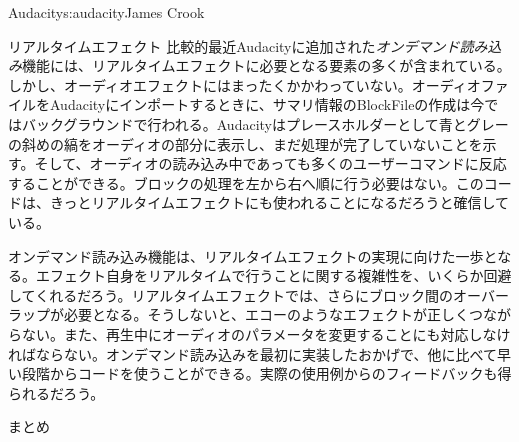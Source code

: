 \begin{aosachapter}{Audacity}{s:audacity}{James Crook}
\begin{aosasect1}{リアルタイムエフェクト}
比較的最近Audacityに追加された\emph{オンデマンド読み込み}機能には、リアルタイムエフェクトに必要となる要素の多くが含まれている。しかし、オーディオエフェクトにはまったくかかわっていない。オーディオファイルをAudacityにインポートするときに、サマリ情報のBlockFileの作成は今ではバックグラウンドで行われる。Audacityはプレースホルダーとして青とグレーの斜めの縞をオーディオの部分に表示し、まだ処理が完了していないことを示す。そして、オーディオの読み込み中であっても多くのユーザーコマンドに反応することができる。ブロックの処理を左から右へ順に行う必要はない。このコードは、きっとリアルタイムエフェクトにも使われることになるだろうと確信している。

オンデマンド読み込み機能は、リアルタイムエフェクトの実現に向けた一歩となる。エフェクト自身をリアルタイムで行うことに関する複雑性を、いくらか回避してくれるだろう。リアルタイムエフェクトでは、さらにブロック間のオーバーラップが必要となる。そうしないと、エコーのようなエフェクトが正しくつながらない。また、再生中にオーディオのパラメータを変更することにも対応しなければならない。オンデマンド読み込みを最初に実装したおかげで、他に比べて早い段階からコードを使うことができる。実際の使用例からのフィードバックも得られるだろう。

\end{aosasect1}

\begin{aosasect1}{まとめ}


\end{aosasect1}
\end{aosachapter}
